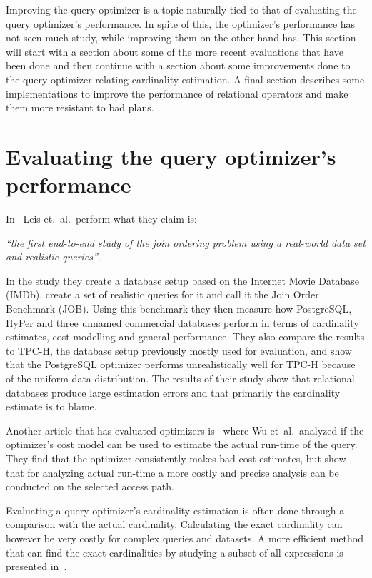 Improving the query optimizer is a topic naturally tied to that of evaluating
the query optimizer's performance. In spite of this, the optimizer's performance
has not seen much study, while improving them on the other hand has. This
section will start with a section about some of the more recent evaluations that
have been done and then continue with a section about some improvements done to
the query optimizer relating cardinality estimation. A final section describes
some implementations to improve the performance of relational operators and make
them more resistant to bad plans.

\section{Evaluating the query optimizer's performance}
In~\cite{leis_2015_how_hgaqor} Leis et.\ al.\ perform what they claim is:

\textit{``the first end-to-end study of the join ordering problem using a
  real-world data set and realistic queries''}.

In the study they create a database setup based on the Internet Movie
Database (IMDb), create a set of realistic queries for it and call it the Join
Order Benchmark (JOB). Using this benchmark they then measure how PostgreSQL,
HyPer and three unnamed commercial databases perform in terms of cardinality
estimates, cost modelling and general performance. They also compare the results
to TPC-H, the database setup previously mostly used for evaluation, and show that
the PostgreSQL optimizer performs unrealistically well for TPC-H because of the
uniform data distribution. The results of their study show that relational
databases produce large estimation errors and that primarily the cardinality
estimate is to blame.

Another article that has evaluated optimizers
is~\cite{wu_2013_predicting_pqetaocmru} where Wu  et\ al.\ analyzed if the
optimizer's cost model can be used to estimate the actual run-time of the query.
They find that the optimizer consistently makes bad cost estimates, but show
that for analyzing actual run-time a more costly and precise analysis can be
conducted on the selected access path.

Evaluating a query optimizer's cardinality estimation is often done through a
comparison with the actual cardinality. Calculating the exact cardinality can
however be very costly for complex queries and datasets. A more efficient method
that can find the exact cardinalities by studying a subset of all expressions is
presented in~\cite{chaudhuri_2009_exact_ecqofot}.

